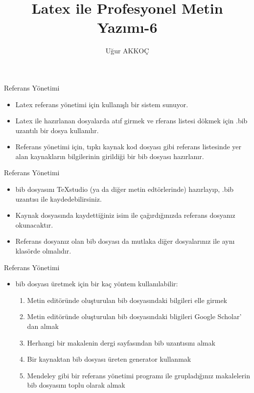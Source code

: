 \documentclass[pdf]{beamer}
\title{Latex ile Profesyonel Metin Yazımı-6}
\author{Uğur AKKOÇ}
\begin{document}
  
	\shorthandoff{=}
	\maketitle
	
	
\begin{frame}{Referans Yönetimi}
\begin{itemize}
	\item Latex referans yönetimi için kullanışlı bir sistem sunuyor.
	\item Latex ile hazırlanan dosyalarda atıf girmek ve rferans listesi dökmek için .bib uzantılı bir dosya kullanılır.
	\item Referans yönetimi için, tıpkı kaynak kod dosyası gibi referans listesinde yer alan kaynakların bilgilerinin girildiği bir bib dosyası hazırlanır.
\end{itemize}
\end{frame}

\begin{frame}{Referans Yönetimi}
\begin{itemize}
	\item bib dosyasını TeXstudio (ya da diğer metin edtörlerinde) hazırlayıp, .bib uzantısı ile kaydedebilirsiniz.
	\item Kaynak dosyasında kaydettiğiniz isim ile çağırdığınızda referans dosyanız okunacaktır.
	\item Referans dosyanız olan bib dosyası da mutlaka diğer dosyalarınız ile aynı klasörde olmalıdır.
\end{itemize}
\end{frame}

\begin{frame}{Referans Yönetimi}
\begin{itemize}
	\item bib dosyası üretmek için bir kaç yöntem kullanılabilir:
	\begin{enumerate}
		\item Metin editöründe oluşturulan bib dosyasındaki bilgileri elle girmek
		\item Metin editöründe oluşturulan bib dosyasındaki bligileri Google Scholar' dan almak
		\item Herhangi bir makalenin dergi sayfasından bib uzantısını almak
		\item Bir kaynaktan bib dosyası üreten generator kullanmak
		\item Mendeley gibi bir referans yönetimi programı ile grupladığınız makalelerin bib dosyasını toplu olarak almak
	\end{enumerate}
\end{itemize}
\end{frame}
\end{document}
